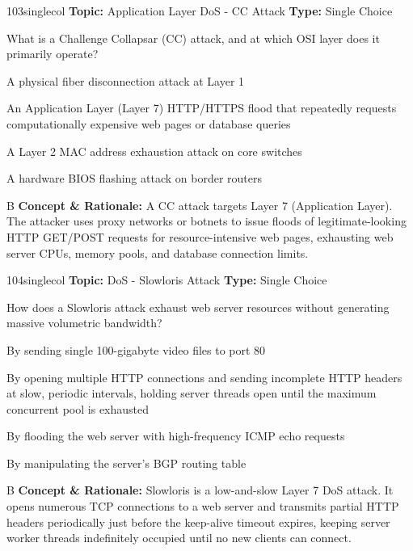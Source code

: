 \begin{qcard}{103}{singlecol}
\textcolor{darkslate!75}{\small\textbf{Topic:} Application Layer DoS - CC Attack \hfill \textbf{Type:} Single Choice}\vspace{0.4em}\par
What is a Challenge Collapsar (CC) attack, and at which OSI layer does it primarily operate?
\begin{qoptions}
\item A physical fiber disconnection attack at Layer 1
\item An Application Layer (Layer 7) HTTP/HTTPS flood that repeatedly requests computationally expensive web pages or database queries
\item A Layer 2 MAC address exhaustion attack on core switches
\item A hardware BIOS flashing attack on border routers
\end{qoptions}
\end{qcard}
\nopagebreak
\begin{explainbox}{B}
\textbf{Concept \& Rationale:} A CC attack targets Layer 7 (Application Layer). The attacker uses proxy networks or botnets to issue floods of legitimate-looking HTTP GET/POST requests for resource-intensive web pages, exhausting web server CPUs, memory pools, and database connection limits.
\end{explainbox}

\begin{qcard}{104}{singlecol}
\textcolor{darkslate!75}{\small\textbf{Topic:} DoS - Slowloris Attack \hfill \textbf{Type:} Single Choice}\vspace{0.4em}\par
How does a Slowloris attack exhaust web server resources without generating massive volumetric bandwidth?
\begin{qoptions}
\item By sending single 100-gigabyte video files to port 80
\item By opening multiple HTTP connections and sending incomplete HTTP headers at slow, periodic intervals, holding server threads open until the maximum concurrent pool is exhausted
\item By flooding the web server with high-frequency ICMP echo requests
\item By manipulating the server's BGP routing table
\end{qoptions}
\end{qcard}
\nopagebreak
\begin{explainbox}{B}
\textbf{Concept \& Rationale:} Slowloris is a low-and-slow Layer 7 DoS attack. It opens numerous TCP connections to a web server and transmits partial HTTP headers periodically just before the keep-alive timeout expires, keeping server worker threads indefinitely occupied until no new clients can connect.
\end{explainbox}

